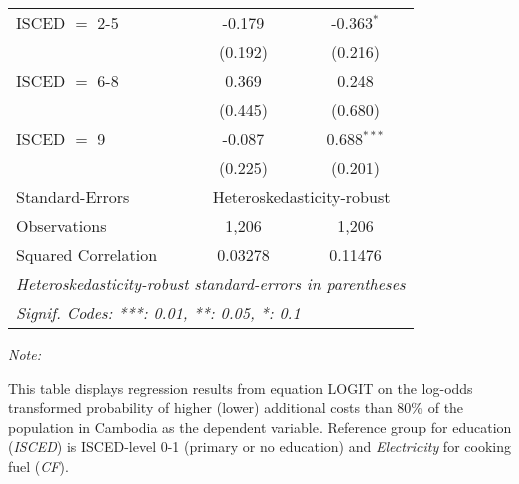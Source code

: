 \begin{table}[htbp!]
\begin{adjustbox}{width = 1\textwidth, max height = 0.95\textheight, center}
\begin{threeparttable}[b]
\begin{tabular}{lcc}
            ISCED $=$ 2-5        & -0.179         & -0.363$^{*}$\\   
                                 & (0.192)        & (0.216)\\   
            ISCED $=$ 6-8        & 0.369          & 0.248\\   
                                 & (0.445)        & (0.680)\\   
            ISCED $=$ 9          & -0.087         & 0.688$^{***}$\\   
                                 & (0.225)        & (0.201)\\   
            \midrule 
            Standard-Errors & \multicolumn{2}{c}{Heteroskedasticity-robust} \\ 
            Observations         & 1,206          & 1,206\\  
            Squared Correlation  & 0.03278        & 0.11476\\  
            \midrule \midrule
            \multicolumn{3}{l}{\emph{Heteroskedasticity-robust standard-errors in parentheses}}\\
            \multicolumn{3}{l}{\emph{Signif. Codes: ***: 0.01, **: 0.05, *: 0.1}}\\
         \end{tabular}
         
         \begin{tablenotes}\item \medskip \textit{Note:}
            \item This table displays regression results from equation LOGIT on the log-odds transformed probability of higher (lower) additional costs than 80\% of the population in Cambodia as the dependent variable. Reference group for education (\textit{ISCED}) is ISCED-level 0-1 (primary or no education) and \textit{Electricity} for cooking fuel (\textit{CF}).
         \end{tablenotes}
      \end{threeparttable}
   \end{adjustbox}
\end{table}


